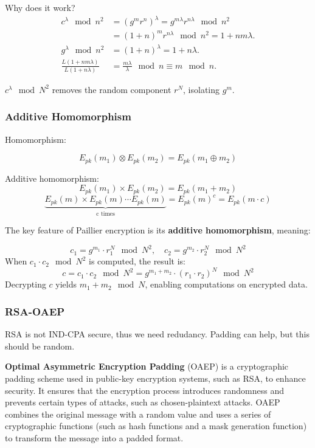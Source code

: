 Why does it work? \\
\begin{align*}
c^\lambda \mod n^2 &= (g^m r^n)^\lambda = g^{m\lambda} r^{n\lambda} \mod n^2 \\
&= (1 + n)^m r^{n\lambda} \mod n^2 = 1 + nm\lambda. \\
g^\lambda \mod n^2 &= (1 + n)^\lambda = 1 + n\lambda. \\
\frac{L(1 + nm\lambda)}{L(1 + n\lambda)} &= \frac{m\lambda}{\lambda} \mod n \equiv m \mod n.
\end{align*}

\( c^\lambda \mod N^2 \) removes the random component \( r^N \), isolating \( g^m \).

\subsubsection{Additive Homomorphism}
Homomorphism:

\[ E_{pk}(m_1) \otimes E_{pk}(m_2) = E_{pk}(m_1 \oplus m_2) \]

Additive homomorphism:
\[ E_{pk}(m_1) \times E_{pk}(m_2) = E_{pk}(m_1 + m_2) \]
\[ \underbrace{E_{pk}(m) \times E_{pk}(m) \cdots E_{pk}(m)}_{\text{c times}}  = E_{pk}(m)^c = E_{pk}(m \cdot c) \]

The key feature of Paillier encryption is its \textbf{additive homomorphism}, meaning:

\[
c_1 = g^{m_1} \cdot r_1^N \mod N^2, \quad c_2 = g^{m_2} \cdot r_2^N \mod N^2
\]
When \( c_1 \cdot c_2 \mod N^2 \) is computed, the result is:
\[
c = c_1 \cdot c_2 \mod N^2 = g^{m_1 + m_2} \cdot (r_1 \cdot r_2)^N \mod N^2
\]
Decrypting \( c \) yields \( m_1 + m_2 \mod N \), enabling computations on encrypted data.



\subsubsection{RSA-OAEP}
RSA is not IND-CPA secure, thus we need redudancy. Padding can help, but this should be random.

\begin{defn}
    \textbf{Optimal Asymmetric Encryption Padding} (OAEP) is a cryptographic padding scheme used in public-key encryption systems, 
    such as RSA, to enhance security. It ensures that the encryption process introduces randomness and 
    prevents certain types of attacks, such as chosen-plaintext attacks.
    OAEP combines the original message with a random value and uses a series of cryptographic functions 
    (such as hash functions and a mask generation function) to transform the message into a padded format.
\end{defn}

